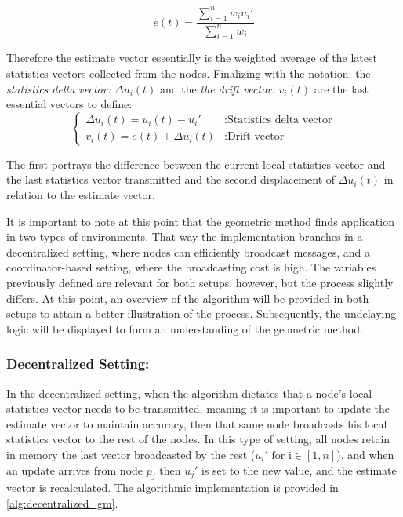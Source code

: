 \begin{equation*}
    e(t) = \frac{\sum_{i=1}^{n}w_i u_i'}{\sum_{i=1}^{n}w_i}
\end{equation*}

\noindent
Therefore the estimate vector essentially is the weighted average of the latest statistics vectors collected from the nodes.
Finalizing with the notation: the \emph{statistics delta vector: $\Delta u_i(t)$} and the \emph{the drift vector: $v_i(t)$} are the last essential vectors to
define:
\begin{equation}
    \label{eq:drift_vector}
    \begin{cases}
        \Delta u_i(t) = u_i(t) - u_i' & : \text{Statistics delta vector} \\
        v_i(t) = e(t) + \Delta u_i(t) & : \text{Drift vector}
    \end{cases}
\end{equation}

\noindent
The first portrays the difference between the current local statistics vector and the last statistics vector transmitted and the
second displacement of $\Delta u_i(t)$ in relation to the estimate vector.

It is important to note at this point that the geometric method finds application in two types of environments. That way the
implementation branches in a decentralized setting, where nodes can efficiently broadcast messages, and a coordinator-based setting,
where the broadcasting cost is high. The variables previously defined are relevant for both setups, however, but the process slightly differs.
At this point, an overview of the algorithm will be provided in both setups to attain a better illustration of the process. Subsequently,
the undelaying logic will be displayed to form an understanding of the geometric method.

\subsubsection{Decentralized Setting:} In the decentralized setting, when the algorithm dictates that a node's local statistics vector needs
to be transmitted, meaning it is important to update the estimate vector to maintain accuracy, then that same node broadcasts his local statistics vector
to the rest of the nodes. In this type of setting, all nodes retain in memory the last vector broadcasted by the rest ($u_i' \text{ for i} \in [1,n]$), and
when an update arrives from node $p_j$ then $u_j'$ is set to the new value, and the estimate vector is recalculated. The algorithmic
implementation is provided in \cref{alg:decentralized_gm}.

